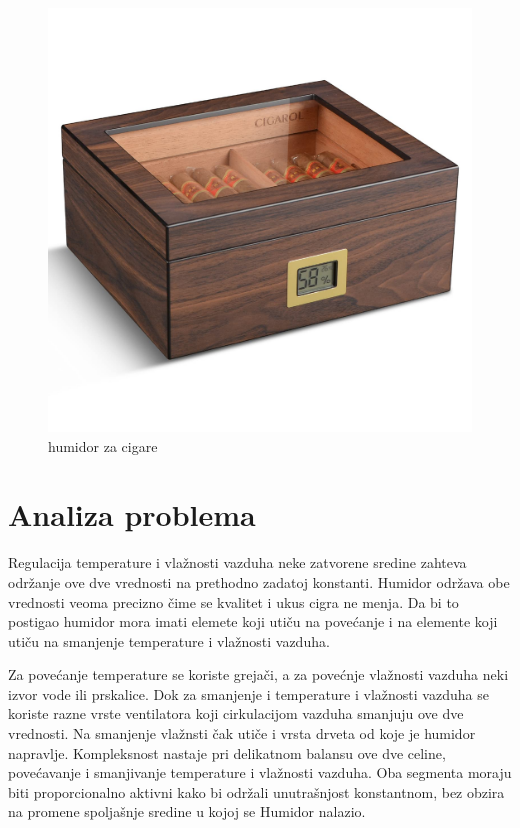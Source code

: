 \documentclass[a4paper, 12pt]{article}
\begin{document}
\vspace{10pt}


\begin{figure}[H]
\centering
\includegraphics[scale=0.13]{images/primer}
\caption{humidor za cigare} \label{primer}
\end{figure}

\pagebreak
\endgroup

\begingroup
\justifying

\section{Analiza problema}

Regulacija temperature i vlažnosti vazduha neke zatvorene sredine zahteva održanje ove dve vrednosti na prethodno zadatoj konstanti. Humidor održava obe vrednosti veoma precizno čime se kvalitet i ukus cigra ne menja. Da bi to postigao humidor mora imati elemete koji utiču na povećanje i na elemente koji utiču na smanjenje temperature i vlažnosti vazduha. 

\vspace{10pt}

Za povećanje temperature se koriste grejači, a za povećnje vlažnosti vazduha neki izvor vode ili prskalice. Dok za smanjenje i temperature i vlažnosti vazduha se koriste razne vrste ventilatora koji cirkulacijom vazduha smanjuju ove dve vrednosti. Na smanjenje vlažnsti čak utiče i vrsta drveta od koje je humidor napravlje. Kompleksnost nastaje pri delikatnom balansu ove dve celine, povećavanje i smanjivanje temperature i vlažnosti vazduha. Oba segmenta moraju biti proporcionalno aktivni kako bi održali unutrašnjost konstantnom, bez obzira na promene spoljašnje sredine u kojoj se Humidor nalazio.
\end{document}
